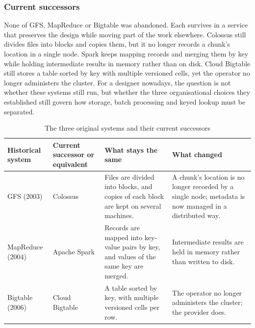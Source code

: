 \subsubsection{Current successors}
None of GFS, MapReduce or Bigtable was abandoned. 
Each survives in a service that preserves the design while moving part of the work elsewhere. 
Colossus still divides files into blocks and copies them, but it no longer records a chunk's location in a single node\cite{colossus2021}. 
Spark keeps mapping records and merging them by key while holding intermediate results in memory rather than on disk\cite{sparkdocs}. 
Cloud Bigtable still stores a table sorted by key with multiple versioned cells, yet the operator no longer administers the cluster\cite{bigtabledocs}. 
For a designer nowadays, the question is not whether these systems still run, but whether the three organisational choices they established still govern how storage, batch processing and keyed lookup must be separated.

\begin{table}[htbp]
  \centering
  \caption{The three original systems and their current successors}
  \label{tab:a3}
  \small
  \renewcommand{\arraystretch}{1.45}
  \setlength{\tabcolsep}{5pt}
  { 
  \begin{tabular}{|p{2.4cm}|p{3.2cm}|p{4.2cm}|p{4.2cm}|}
    \hline
    \textbf{Historical system} & \textbf{Current successor or equivalent} & \textbf{What stays the same} & \textbf{What changed} \\
    \hline
    GFS (2003) &
    Colossus &
    Files are divided into blocks, and copies of each block are kept on several machines. &
    A chunk's location is no longer recorded by a single node; metadata is now managed in a distributed way. \\
    \hline
    MapReduce (2004) &
    Apache Spark &
    Records are mapped into key-value pairs by key, and values of the same key are merged. &
    Intermediate results are held in memory rather than written to disk. \\
    \hline
    Bigtable (2006) &
    Cloud Bigtable &
    A table sorted by key, with multiple versioned cells per row. &
    The operator no longer administers the cluster; the provider does. \\
    \hline
  \end{tabular}}
\end{table}